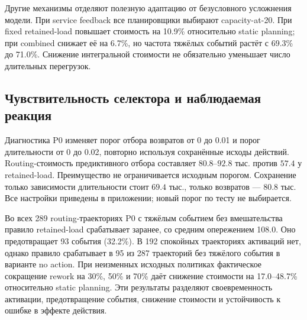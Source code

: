 Другие механизмы отделяют полезную адаптацию от безусловного усложнения модели. При service feedback все планировщики выбирают capacity-at-20. При fixed retained-load повышает стоимость на 10.9\% относительно static planning; при combined снижает её на 6.7\%, но частота тяжёлых событий растёт с 69.3\% до 71.0\%. Снижение интегральной стоимости не обязательно уменьшает число длительных перегрузок.

\subsection{Чувствительность селектора и наблюдаемая реакция}
Диагностика P0 изменяет порог отбора возвратов от 0 до 0.01 и порог длительности от 0 до 0.02, повторно используя сохранённые исходы действий. Routing-стоимость предиктивного отбора составляет $80.8$--$92.8$ тыс. против $57.4$ у retained-load. Преимущество не ограничивается исходным порогом. Сохранение только зависимости длительности стоит $69.4$ тыс., только возвратов — $80.8$ тыс. Все настройки приведены в приложении; новый порог по тесту не выбирается.

Во всех 289 routing-траекториях P0 с тяжёлым событием без вмешательства правило retained-load срабатывает заранее, со средним опережением 108.0. Оно предотвращает 93 события (32.2\%). В 192 спокойных траекториях активаций нет, однако правило срабатывает в 95 из 287 траекторий без тяжёлого события в варианте no action. При неизменных исходных политиках фактическое сокращение rework на 30\%, 50\% и 70\% даёт снижение стоимости на 17.0--48.7\% относительно static planning. Эти результаты разделяют своевременность активации, предотвращение события, снижение стоимости и устойчивость к ошибке в эффекте действия.


